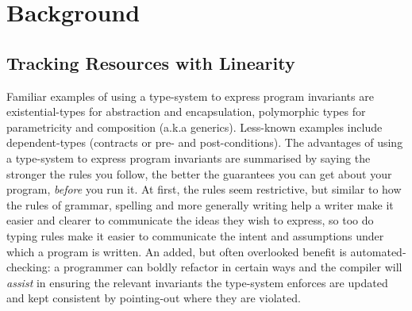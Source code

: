 \chapter{Background}

%

%

\section{Tracking Resources with Linearity}
Familiar examples of using a type-system to express program invariants are
existential-types for abstraction and encapsulation, polymorphic types for
parametricity and composition (a.k.a generics). Less-known examples include
dependent-types (contracts or pre- and post-conditions). The advantages of
using a type-system to express program invariants are summarised by saying the
stronger the rules you follow, the better the guarantees you can get about your
program, \emph{before} you run it. At first, the rules seem restrictive, but
similar to how the rules of grammar, spelling and more generally writing help a
writer make it easier and clearer to communicate the ideas they wish to express,
so too do typing rules make it easier to communicate the intent and
assumptions under which a program is written. An added, but often overlooked
benefit is automated-checking: a programmer can boldly refactor in certain
ways and the compiler will \emph{assist} in ensuring the relevant invariants
the type-system enforces are updated and kept consistent by pointing-out
where they are violated.

